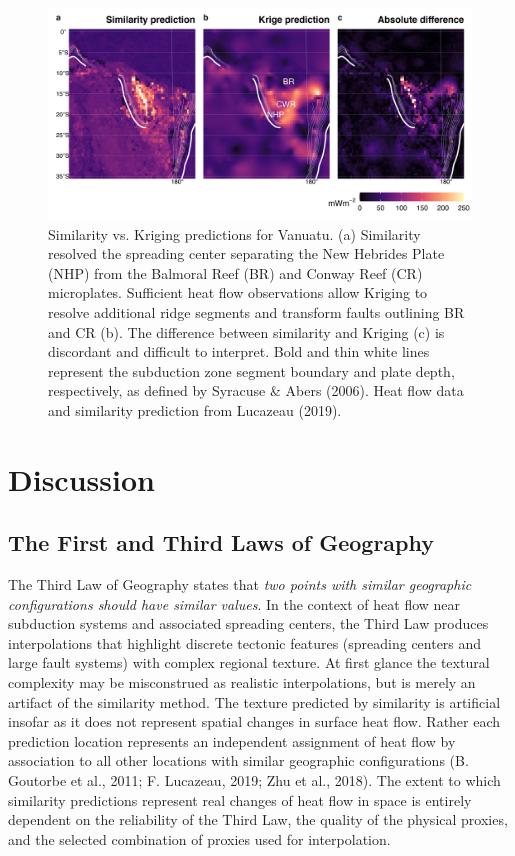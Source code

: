 \documentclass[draft,linenumbers]{agujournal2018}
\begin{document}
\begin{figure}[h]

{\centering \includegraphics[width=0.95\linewidth,]{../figs/diff/custom/Vanuatu} 

}

\caption{Similarity vs. Kriging predictions for Vanuatu. (a) Similarity resolved the spreading center separating the New Hebrides Plate (NHP) from the Balmoral Reef (BR) and Conway Reef (CR) microplates. Sufficient heat flow observations allow Kriging to resolve additional ridge segments and transform faults outlining BR and CR (b). The difference between similarity and Kriging (c) is discordant and difficult to interpret. Bold and thin white lines represent the subduction zone segment boundary and plate depth, respectively, as defined by Syracuse \& Abers (2006). Heat flow data and similarity prediction from Lucazeau (2019).}\label{fig:vanuatu.diff}
\end{figure}

\clearpage

\section{Discussion}

\subsection{The First and Third Laws of Geography}

The Third Law of Geography states that \emph{two points with similar
geographic configurations should have similar values}. In the context of
heat flow near subduction systems and associated spreading centers, the
Third Law produces interpolations that highlight discrete tectonic
features (spreading centers and large fault systems) with complex
regional texture. At first glance the textural complexity may be
misconstrued as realistic interpolations, but is merely an artifact of
the similarity method. The texture predicted by similarity is artificial
insofar as it does not represent spatial changes in surface heat flow.
Rather each prediction location represents an independent assignment of
heat flow by association to all other locations with similar geographic
configurations (B. Goutorbe et al., 2011; F. Lucazeau, 2019; Zhu et al.,
2018). The extent to which similarity predictions represent real changes
of heat flow in space is entirely dependent on the reliability of the
Third Law, the quality of the physical proxies, and the selected
combination of proxies used for interpolation.
\end{document}
